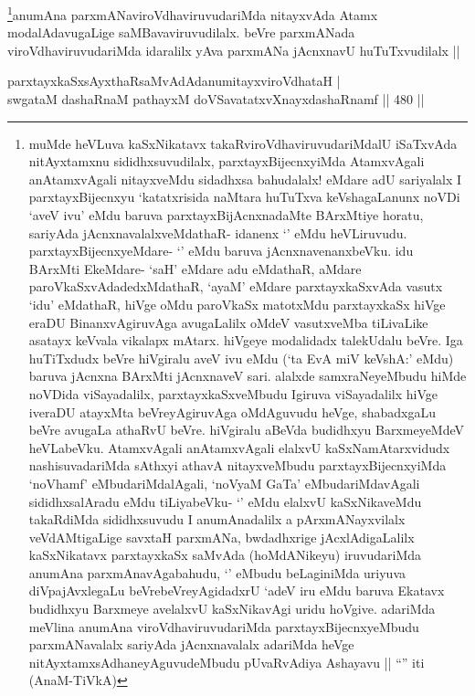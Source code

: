 \begin{artha}
\footnote{muMde heVLuva kaSxNikatavx takaRviroVdhaviruvudariMdalU iSaTxvAda nitAyxtamxnu sididhxsuvudilalx, parxtayxBijecnxyiMda AtamxvAgali anAtamxvAgali nitayxveMdu sidadhxsa bahudalalx! eMdare adU sariyalalx I parxtayxBijecnxyu `katatxrisida naMtara huTuTxva keVshagaLanunx noVDi `aveV ivu' eMdu baruva parxtayxBijAcnxnadaMte BArxMtiye horatu, sariyAda jAcnxnavalalxveMdathaR- idanenx `\stext' eMdu heVLiruvudu. parxtayxBijecnxyeMdare- `\stext' eMdu baruva jAcnxnavenanxbeVku. idu BArxMti EkeMdare- `saH' eMdare adu eMdathaR, aMdare paroVkaSxvAdadedxMdathaR, `ayaM' eMdare parxtayxkaSxvAda vasutx `idu' eMdathaR, hiVge oMdu paroVkaSx matotxMdu parxtayxkaSx hiVge eraDU BinanxvAgiruvAga avugaLalilx oMdeV vasutxveMba tiLivaLike asatayx keVvala vikalapx mAtarx. hiVgeye modalidadx talekUdalu beVre. Iga huTiTxdudx beVre hiVgiralu aveV ivu eMdu (`ta EvA miV keVshA:' eMdu) baruva jAcnxna BArxMti jAcnxnaveV sari. alalxde samxraNeyeMbudu hiMde noVDida viSayadalilx, parxtayxkaSxveMbudu Igiruva viSayadalilx hiVge iveraDU atayxMta beVreyAgiruvAga oMdAguvudu heVge, shabadxgaLu beVre avugaLa athaRvU beVre. hiVgiralu aBeVda budidhxyu BarxmeyeMdeV heVLabeVku. AtamxvAgali anAtamxvAgali elalxvU kaSxNamAtarxvidudx nashisuvadariMda sAthxyi athavA nitayxveMbudu parxtayxBijecnxyiMda `noV\s hamf' eMbudariMdalAgali, `noV\s yaM GaTa' eMbudariMdavAgali sididhxsalAradu eMdu tiLiyabeVku- `\stext' eMdu elalxvU kaSxNikaveMdu takaRdiMda sididhxsuvudu I anumAnadalilx a pArxmANayxvilalx veVdAMtigaLige savxtaH parxmANa, bwdadhxrige jAcxlAdigaLalilx kaSxNikatavx parxtayxkaSx saMvAda (hoMdANikeyu) iruvudariMda anumAna parxmAnavAgabahudu, `\stext' eMbudu beLaginiMda uriyuva diVpajAvxlegaLu beVrebeVreyAgidadxrU `adeV iru eMdu baruva Ekatavx budidhxyu Barxmeye avelalxvU kaSxNikavAgi uridu hoVgive. adariMda meVlina anumAna viroVdhaviruvudariMda parxtayxBijecnxyeMbudu parxmANavalalx sariyAda jAcnxnavalalx adariMda heVge nitAyxtamxsAdhaneyAguvudeMbudu pUvaRvAdiya Ashayavu || ``\stext'' iti (AnaM-TiVkA)}anumAna parxmANaviroVdhaviruvudariMda nitayxvAda Atamx modalAdavugaLige saMBavaviruvudilalx. beVre parxmANada viroVdhaviruvudariMda idaralilx yAva parxmANa jAcnxnavU huTuTxvudilalx ||
\end{artha}

\begin{shl}
parxtayxkaSxsAyxthaRsaMvAdAdanumitayxviroVdhataH | \\
swgataM dashaRnaM pathayxM doVSavatatxvXnayxdashaRnamf \hfill||  480 ||  
\end{shl}

